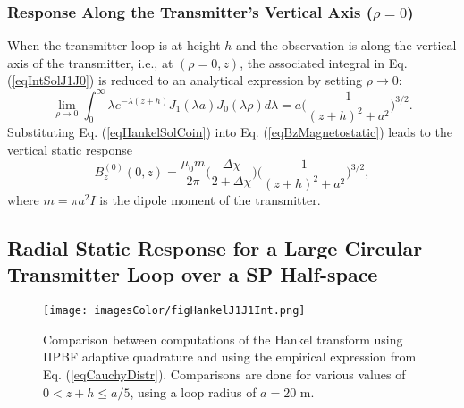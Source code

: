 \documentclass[journal]{IEEEtran}  %
\begin{document}
\subsubsection{Response Along the Transmitter's Vertical Axis ($\rho = 0$)}
When the transmitter loop is at height $h$ and the
observation is along the vertical axis of the transmitter, i.e., at
$(\rho =0, z)$, the associated integral in Eq. (\ref{eqIntSolJ1J0})
is reduced to an analytical expression by setting $\rho \rightarrow
0$:
\begin{equation}
\lim_{\rho \rightarrow 0} \int^{\infty}_0 \!\!\! \lambda e^{-\lambda
(z+h)} J_1(\lambda a) J_0 (\lambda \rho) d \lambda \! = \! a \Bigg (
\! \frac{1}{(z+h)^2 + a^2} \! \Bigg )^{3/2}. \label{eqHankelSolCoin}
\end{equation}
Substituting Eq. (\ref{eqHankelSolCoin}) into Eq.
(\ref{eqBzMagnetostatic}) leads to the vertical static response
\begin{equation}
\label{eqStaticCoinBz}
B_z^{(0)}(0,z) = \frac{\mu_0 m}{2 \pi} \Bigg
( \frac{\Delta \chi}{2 + \Delta \chi} \Bigg ) \Bigg (
\frac{1}{(z+h)^2 + a^2} \Bigg )^{3/2},
\end{equation}
where $m=\pi a^2 I$ is the dipole moment of the transmitter.


\subsection{Radial Static Response for a Large Circular Transmitter Loop over a SP Half-space}
\label{secRadial}

\begin{figure}[!b]
\centering
\texttt{[image: imagesColor/figHankelJ1J1Int.png]}
\caption{Comparison between computations of the
Hankel transform using IIPBF adaptive quadrature and using the
empirical expression from Eq. (\ref{eqCauchyDistr}). Comparisons are
done for various values of $0 < z+h \leq a/5$, using a loop radius
of $a = 20$ m.} \label{figHankelJ1J1Int}
\end{figure}
%
\end{document}
